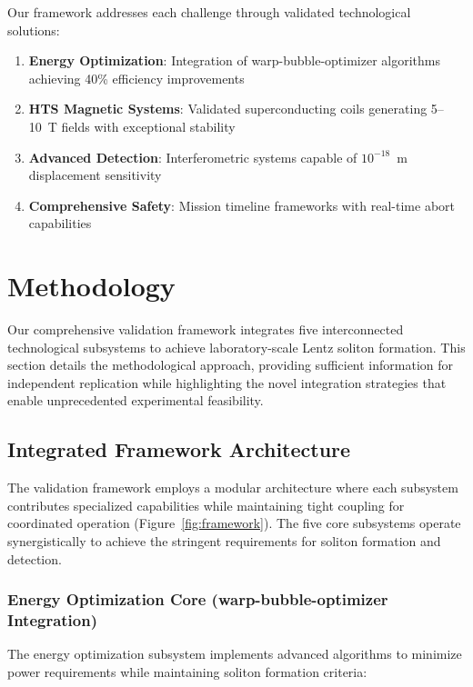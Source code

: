 \documentclass[12pt,a4paper]{article}
\begin{document}
Our framework addresses each challenge through validated technological solutions:
\begin{enumerate}
\item \textbf{Energy Optimization}: Integration of warp-bubble-optimizer algorithms achieving 40\% efficiency improvements
\item \textbf{HTS Magnetic Systems}: Validated superconducting coils generating 5--10~T fields with exceptional stability
\item \textbf{Advanced Detection}: Interferometric systems capable of $10^{-18}$~m displacement sensitivity
\item \textbf{Comprehensive Safety}: Mission timeline frameworks with real-time abort capabilities
\end{enumerate}

\section{Methodology}

Our comprehensive validation framework integrates five interconnected technological subsystems to achieve laboratory-scale Lentz soliton formation. This section details the methodological approach, providing sufficient information for independent replication while highlighting the novel integration strategies that enable unprecedented experimental feasibility.

\subsection{Integrated Framework Architecture}

The validation framework employs a modular architecture where each subsystem contributes specialized capabilities while maintaining tight coupling for coordinated operation (Figure~\ref{fig:framework}). The five core subsystems operate synergistically to achieve the stringent requirements for soliton formation and detection.

\subsubsection{Energy Optimization Core (warp-bubble-optimizer Integration)}

The energy optimization subsystem implements advanced algorithms to minimize power requirements while maintaining soliton formation criteria:
\end{document}
